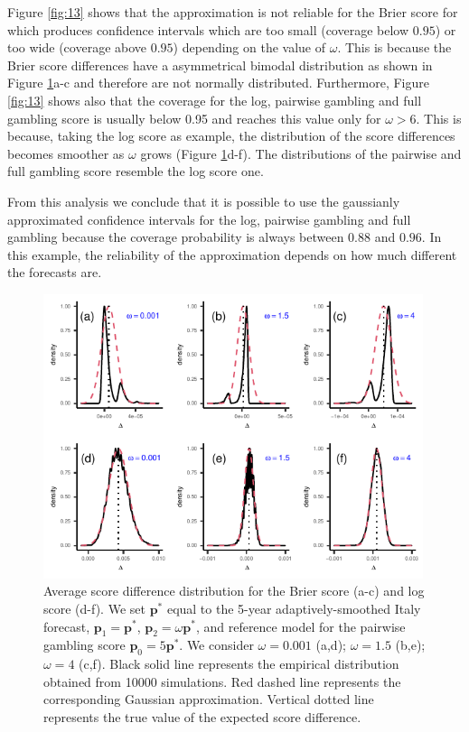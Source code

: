 \documentclass[referee,sn-basic]{sn-jnl}
\theoremstyle{thmstyleone}%
\theoremstyle{thmstyletwo}%
\theoremstyle{thmstylethree}%
\begin{document}
\begin{appendices}
Figure \ref{fig:13} shows that the approximation is not reliable for the Brier score for which produces confidence intervals which are too small (coverage below $0.95$) or too wide (coverage above $0.95$) depending on the value of $\omega$. This is because the Brier score differences have a asymmetrical bimodal distribution as shown in Figure \ref{fig:14}a-c and therefore are not normally distributed. Furthermore, Figure \ref{fig:13} shows also that the coverage for the log, pairwise gambling and full gambling score is usually below 0.95 and reaches this value only for $\omega > 6$. This is because, taking the log score as example, the distribution of the score differences becomes smoother as $\omega$ grows (Figure \ref{fig:14}d-f). The distributions of the pairwise and full gambling score resemble the log score one. 

From this analysis we conclude that it is possible to use the gaussianly approximated confidence intervals for the log, pairwise gambling and full gambling because the coverage probability is always between $0.88$ and $0.96$. In this example, the reliability of the approximation depends on how much different the forecasts are. 

\begin{figure}[H]
  \includegraphics[width = 0.99\textwidth]{figure14.pdf}
\caption{Average score difference distribution for the Brier score (a-c) and log score (d-f). We set $\mathbf p^*$ equal to the 5-year adaptively-smoothed Italy forecast, $\mathbf p_1 = \mathbf p^*$, $\mathbf p_2 = \omega \mathbf p^*$, and reference model for the pairwise gambling score $\mathbf p_0 = 5\mathbf p^*$. We consider $\omega = 0.001$ (a,d); $\omega = 1.5$ (b,e); $\omega = 4$ (c,f). Black solid line represents the empirical distribution obtained from 10000 simulations. Red dashed line represents the corresponding Gaussian approximation. Vertical dotted line represents the true value of the expected score difference.}
\label{fig:14}
\end{figure}

\end{appendices}




\end{document}
